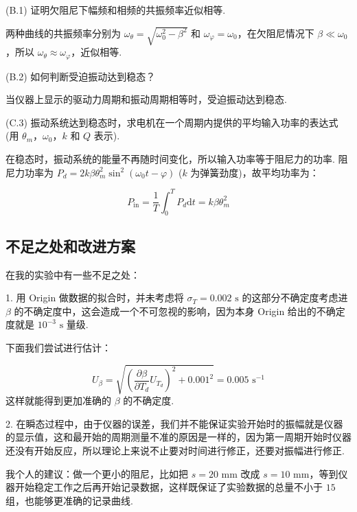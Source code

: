 \documentclass{THUexprep}
\begin{document}
(B.1) 证明欠阻尼下幅频和相频的共振频率近似相等.

两种曲线的共振频率分别为 $\omega_\theta=\sqrt{\omega_0^2-\beta^2}$ 和 $\omega_\varphi=\omega_0$，在欠阻尼情况下 $\beta\ll\omega_0$，所以 $\omega_\theta\approx\omega_\varphi$，近似相等.

(B.2) 如何判断受迫振动达到稳态？

当仪器上显示的驱动力周期和振动周期相等时，受迫振动达到稳态.

(C.3) 振动系统达到稳态时，求电机在一个周期内提供的平均输入功率的表达式 (用 $\theta_m$，$\omega_0$，$k$ 和 $Q$ 表示).

在稳态时，振动系统的能量不再随时间变化，所以输入功率等于阻尼力的功率. 阻尼力功率为 $P_d=2k\beta\theta_m^2\sin^2(\omega_0t-\varphi)$ ($k$ 为弹簧劲度)，故平均功率为：

\begin{equation}
    P_{\text{in}} = \frac{1}{T}\int_0^TP_d\text{d}t = k\beta\theta_m^2
\end{equation}

\subsection{不足之处和改进方案}

在我的实验中有一些不足之处：\newline

1. 用 Origin 做数据的拟合时，并未考虑将 $\sigma_T=0.002\text{ s}$ 的这部分不确定度考虑进 $\beta$ 的不确定度中，这会造成一个不可忽视的影响，因为本身 Origin 给出的不确定度就是 $10^{-3}\text{ s}$ 量级.

下面我们尝试进行估计：

\begin{equation}
    U_{\beta} = \sqrt{\left(\frac{\partial \beta}{\partial T_d}U_{T_d}\right)^2+0.001^2} = 0.005\text{ s}^{-1}
\end{equation}
\newline
这样就能得到更加准确的 $\beta$ 的不确定度.\newline

2. 在瞬态过程中，由于仪器的误差，我们并不能保证实验开始时的振幅就是仪器的显示值，这和最开始的周期测量不准的原因是一样的，因为第一周期开始时仪器还没有开始反应，所以理论上来说不止要对时间进行修正，还要对振幅进行修正.

我个人的建议：做一个更小的阻尼，比如把 $s=20\text{ mm}$ 改成 $s=10\text{ mm}$，等到仪器开始稳定工作之后再开始记录数据，这样既保证了实验数据的总量不小于 $15$ 组，也能够更准确的记录曲线.\newline
\end{document}
